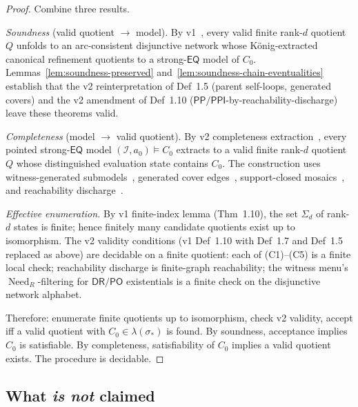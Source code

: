 \documentclass[11pt]{article}
\theoremstyle{definition}
\theoremstyle{remark}
\newcommand{\DR}{\mathsf{DR}}
\newcommand{\PO}{\mathsf{PO}}
\newcommand{\PP}{\mathsf{PP}}
\newcommand{\PPI}{\mathsf{PPI}}
\newcommand{\EQ}{\mathsf{EQ}}
\newcommand{\Need}{\operatorname{Need}}
\begin{document}
\begin{proof}
Combine three results.

\smallskip
\noindent\emph{Soundness} (valid quotient $\to$ model). By
v1~\cite[Thms 1.17, 1.18, 1.19]{SiblingV1}, every valid finite
rank-$d$ quotient $Q$ unfolds to an arc-consistent disjunctive
network whose König-extracted canonical refinement quotients to a
strong-$\EQ$ model of $C_0$.
Lemmas~\ref{lem:soundness-preserved}
and~\ref{lem:soundness-chain-eventualities} establish that the v2
reinterpretation of Def~1.5 (parent self-loops, generated covers)
and the v2 amendment of Def~1.10
($\PP/\PPI$-by-reachability-discharge) leave these theorems
valid.

\smallskip
\noindent\emph{Completeness} (model $\to$ valid quotient). By
v2 completeness extraction~\cite[Thm 12.1]{CompletenessV2}, every
pointed strong-$\EQ$ model $(\mathcal{I}, a_0) \models C_0$
extracts to a valid finite rank-$d$ quotient $Q$ whose
distinguished evaluation state contains $C_0$. The construction
uses witness-generated submodels~\cite[\S 3]{CompletenessV2},
generated cover edges~\cite[\S 4]{CompletenessV2}, support-closed
mosaics~\cite[\S 6]{CompletenessV2}, and reachability
discharge~\cite[\S 11]{CompletenessV2}.

\smallskip
\noindent\emph{Effective enumeration.} By v1 finite-index lemma
(Thm~1.10), the set $\Sigma_d$ of rank-$d$ states is finite; hence
finitely many candidate quotients exist up to isomorphism. The v2
validity conditions (v1 Def~1.10 with Def~1.7 and Def~1.5
replaced as above) are decidable on a finite quotient: each of
(C1)--(C5) is a finite local check; reachability discharge is
finite-graph reachability; the witness menu's
$\Need_R$-filtering for $\DR/\PO$ existentials is a finite check
on the disjunctive network alphabet.

\smallskip
Therefore: enumerate finite quotients up to isomorphism, check
v2 validity, accept iff a valid quotient with $C_0 \in
\lambda(\sigma_\ast)$ is found. By soundness, acceptance implies
$C_0$ is satisfiable. By completeness, satisfiability of $C_0$
implies a valid quotient exists. The procedure is decidable.
\qedhere
\end{proof}

\subsection{What \emph{is not} claimed}
\end{document}
